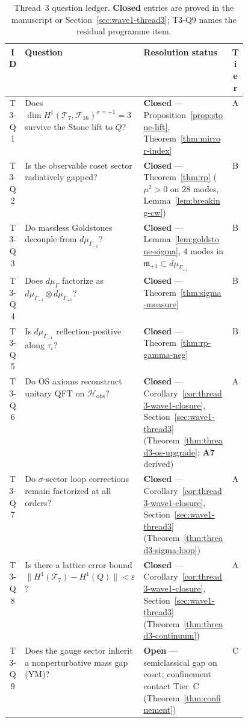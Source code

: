 \begin{table}[ht]
\centering
\small
\renewcommand{\arraystretch}{1.14}
\begin{tabular}{@{}clp{0.46\linewidth}c@{}}
\toprule
\textbf{ID} & \textbf{Question} & \textbf{Resolution status} & \textbf{Tier} \\
\midrule
T3-Q1 &
  Does $\dim H^1(\mathcal{T}_7,\mathcal{F}_{16})^{\sigma=-1}=3$
  survive the Stone lift to $Q$? &
  \textbf{Closed} --- Proposition~\ref{prop:stone-lift},
  Theorem~\ref{thm:mirror-index} &
  A \\
T3-Q2 &
  Is the observable coset sector radiatively gapped? &
  \textbf{Closed} --- Theorem~\ref{thm:rp} ($\mu^2>0$ on $28$ modes,
  Lemma~\ref{lem:breaking-cw}) &
  B \\
T3-Q3 &
  Do massless Goldstones decouple from $d\mu_{\Gamma_{-1}}$? &
  \textbf{Closed} --- Lemma~\ref{lem:goldstone-sigma},
  $4$ modes in $\mathfrak{m}_{+1}\subset d\mu_{\Gamma_{+1}}$ &
  B \\
T3-Q4 &
  Does $d\mu_\Gamma$ factorize as
  $d\mu_{\Gamma_{-1}}\otimes d\mu_{\Gamma_{+1}}$? &
  \textbf{Closed} --- Theorem~\ref{thm:sigma-measure} &
  B \\
T3-Q5 &
  Is $d\mu_{\Gamma_{-1}}$ reflection-positive along $\tau_\iota$? &
  \textbf{Closed} --- Theorem~\ref{thm:rp-gamma-neg} &
  B \\
T3-Q6 &
  Do OS axioms reconstruct unitary QFT on $\mathcal{H}_{\mathrm{obs}}$? &
  \textbf{Closed} --- Corollary~\ref{cor:thread3-wave1-closure},
  Section~\ref{sec:wave1-thread3}
  (Theorem~\ref{thm:thread3-os-upgrade}; \textbf{A7} derived) &
  A \\
T3-Q7 &
  Do $\sigma$-sector loop corrections remain factorized at all orders? &
  \textbf{Closed} --- Corollary~\ref{cor:thread3-wave1-closure},
  Section~\ref{sec:wave1-thread3}
  (Theorem~\ref{thm:thread3-sigma-loop}) &
  A \\
T3-Q8 &
  Is there a lattice error bound
  $\|H^1(\mathcal{T}_7)-H^1(Q)\|<\varepsilon$? &
  \textbf{Closed} --- Corollary~\ref{cor:thread3-wave1-closure},
  Section~\ref{sec:wave1-thread3}
  (Theorem~\ref{thm:thread3-continuum}) &
  A \\
T3-Q9 &
  Does the gauge sector inherit a nonperturbative mass gap (YM)? &
  \textbf{Open} --- semiclassical gap on coset;
  confinement contact Tier~C (Theorem~\ref{thm:confinement}) &
  C \\
\bottomrule
\end{tabular}
\caption{Thread~3 question ledger. \textbf{Closed} entries are proved in the
manuscript or Section~\ref{sec:wave1-thread3}; T3-Q9 names the residual
programme item.}
\label{tab:thread-3-questions}
\end{table}

